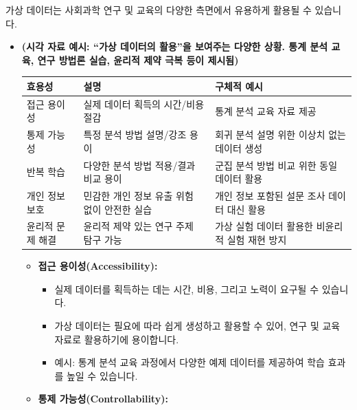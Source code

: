 \documentclass[
  letterpaper,
]{book}
\providecommand{\tightlist}{%
  \setlength{\itemsep}{0pt}\setlength{\parskip}{0pt}}
\begin{document}
가상 데이터는 사회과학 연구 및 교육의 다양한 측면에서 유용하게 활용될 수
있습니다.

\begin{itemize}
\item
  \textbf{(시각 자료 예시: ``가상 데이터의 활용''을 보여주는 다양한
  상황. 통계 분석 교육, 연구 방법론 실습, 윤리적 제약 극복 등이 제시됨)}

  \begin{longtable}[]{@{}
    >{\centering\arraybackslash}p{}
    >{\centering\arraybackslash}p{}
    >{\centering\arraybackslash}p{}@{}}
  \toprule\noalign{}
  \begin{minipage}[b]{\linewidth}\centering
  효용성
  \end{minipage} & \begin{minipage}[b]{\linewidth}\centering
  설명
  \end{minipage} & \begin{minipage}[b]{\linewidth}\centering
  구체적 예시
  \end{minipage} \\
  \midrule\noalign{}
  \endhead
  \bottomrule\noalign{}
  \endlastfoot
  접근 용이성 & 실제 데이터 획득의 시간/비용 절감 & 통계 분석 교육 자료
  제공 \\
  통제 가능성 & 특정 분석 방법 설명/강조 용이 & 회귀 분석 설명 위한
  이상치 없는 데이터 생성 \\
  반복 학습 & 다양한 분석 방법 적용/결과 비교 용이 & 군집 분석 방법 비교
  위한 동일 데이터 활용 \\
  개인 정보 보호 & 민감한 개인 정보 유출 위험 없이 안전한 실습 & 개인
  정보 포함된 설문 조사 데이터 대신 활용 \\
  윤리적 문제 해결 & 윤리적 제약 있는 연구 주제 탐구 가능 & 가상 실험
  데이터 활용한 비윤리적 실험 재현 방지 \\
  \end{longtable}

  \begin{itemize}
  \tightlist
  \item
    \textbf{접근 용이성(Accessibility):}

    \begin{itemize}
    \tightlist
    \item
      실제 데이터를 획득하는 데는 시간, 비용, 그리고 노력이 요구될 수
      있습니다.
    \item
      가상 데이터는 필요에 따라 쉽게 생성하고 활용할 수 있어, 연구 및
      교육 자료로 활용하기에 용이합니다.
    \item
      예시: 통계 분석 교육 과정에서 다양한 예제 데이터를 제공하여 학습
      효과를 높일 수 있습니다.
    \end{itemize}
  \item
    \textbf{통제 가능성(Controllability):}


\end{itemize}
\end{itemize}
\end{document}
